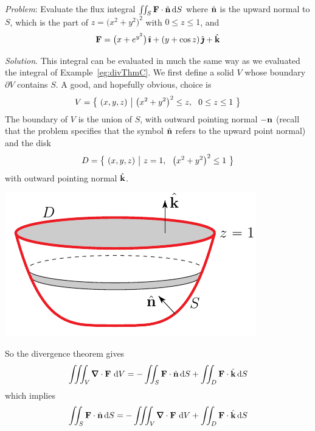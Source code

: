 \begin{eg}\label{eg:divThmC}
\noindent\textit{Problem}:
Evaluate the flux integral $\iint_S \mathbf{F}\cdot\hat{\mathbf{n}}\,\mathrm{d}S$ where
$\hat{\mathbf{n}} $ is the upward normal to $S$, which is the part of 
$z={\big(x^2+y^2\big)}^2$ with $0\le z\le 1$, and
\begin{equation*}
\mathbf{F} = \big(x+e^{y^2}\big)\,\hat{\pmb{\imath}} + (y+\cos z)\,\hat{\pmb{\jmath}} + \hat{\mathbf{k}}
\end{equation*}

\medskip
\noindent\textit{Solution}.
This integral can be evaluated in much the same way as we evaluated 
the integral of Example~\ref{eg:divThmC}. We first define a solid $V$ 
whose boundary $\partial V$ contains $S$. A good, and hopefully obvious, 
choice is
\begin{align*}
V = \big\{ \ (x,y,z)\ \big|\ {\big(x^2+y^2\big)}^2\le z,\ \ 0\le z\le 1 \ \big\}
\end{align*}
The boundary of $V$ is the union of $S$, with outward pointing normal $-\mathbf{n}$
(recall that the problem specifies that the symbol $\hat{\mathbf{n}}$ refers to
the upward point normal)  and the disk
\begin{equation*}
D = \Set{(x,y,z)}{z= 1,\ \  {\big(x^2+y^2\big)}^2\le 1}
\end{equation*}
with outward pointing normal $\hat{\mathbf{k}}$.
\begin{nfig}
\begin{center}
    \includegraphics{bowl.pdf}
\end{center}
\end{nfig}
So the divergence theorem gives
\begin{align*}
\tripInt_V\vnabla\cdot\vF\ \dee{V} 
= -\dblInt_S \vF\cdot\hn\,\dee{S}
 +\dblInt_{D} \vF\cdot\hk\,\dee{S}
\end{align*}
which implies
\begin{align*}
\dblInt_S \vF\cdot\hn\,\dee{S}
&= -\tripInt_V\vnabla\cdot\vF\ \dee{V} 
  +\dblInt_{D} \vF\cdot\hk\,\dee{S} \\

\end{align*}
\end{eg}
